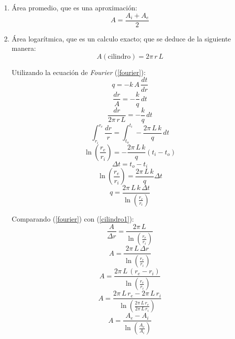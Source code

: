 \begin{enumerate}
\item Área promedio, que es una aproximación:
\begin{equation*}
    A=\frac{A_i+A_e}{2}
\end{equation*}
\item Área logarítmica, que es un calculo exacto; que se deduce de la siguiente
manera:
\begin{equation*}
    A(\text{cilindro})=2\pi\,r\,L
\end{equation*}

Utilizando la ecuación de \emph{Fourier} (\ref{fourier}):
\begin{equation*}
    q=-k\,A\,\frac{dt}{dr}
\end{equation*}
\begin{equation*}
    \frac{dr}{A}=-\frac{k}{q}\,dt
\end{equation*}
\begin{equation*}
    \frac{dr}{2\pi\,r\,L}=-\frac{k}{q}\,dt
\end{equation*}
\begin{equation*}
    \int_{r_i}^{r_e}\frac{dr}{r}=\int_{t_o}^{t_i}-\frac{2\pi\,L\,k}{q}\,dt
\end{equation*}
\begin{equation*}
    \ln\left(\frac{r_e}{r_i}\right)=-\frac{2\pi\,L\,k}{q}(t_i-t_o)
\end{equation*}
\begin{equation*}
    \Delta t=t_o-t_i
\end{equation*}
\begin{equation*}
    \ln\left(\frac{r_e}{r_i}\right)=\frac{2\pi\,L\,k}{q}\Delta t
\end{equation*}
\begin{equation}
    q=\frac{2\pi\,L\,k\,\Delta t}{\ln\left(\frac{r_e}{r_i}\right)}
    \label{cilindro1}
\end{equation}

Comparando (\ref{fourier}) con (\ref{cilindro1}):
\begin{equation*}
    \frac{A}{\Delta r}=\frac{2\pi\,L}{\ln\left(\frac{r_e}{r_i}\right)}
\end{equation*}
\begin{equation*}
    A=\frac{2\pi\,L\,\Delta r}{\ln\left(\frac{r_e}{r_i}\right)}
\end{equation*}
\begin{equation*}
    A=\frac{2\pi\,L\,(r_e-r_i)}{\ln\left(\frac{r_e}{r_i}\right)}
\end{equation*}
\begin{equation*}
    A=\frac{2\pi\,L\,r_e-2\pi\,L\,r_i}
    {\ln\left(\frac{2\pi\,L\,r_e}{2\pi\,L\,r_i}\right)}
\end{equation*}
\begin{equation}
    A=\frac{A_e-A_i}{\ln\left(\frac{A_e}{A_i}\right)}
    \label{cilindro2}
\end{equation}
\end{enumerate}

